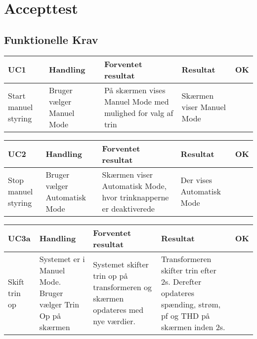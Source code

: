 \chapter{Accepttest}


\section{Funktionelle Krav}
\begin{table}[htbp]
	\centering
	\begin{tabular}{|p{2cm}|p{3cm}|p{4cm}|p{4.5cm}|p{1cm}|}
		\hline
		\textbf{UC1} & \textbf{Handling} & \textbf{Forventet resultat} & \textbf{Resultat} &\textbf{OK} \\\hline
		Start manuel styring & Bruger vælger Manuel Mode & På skærmen vises Manuel Mode med mulighed for valg af trin & Skærmen viser Manuel Mode & \checkmark \\\hline
		
		
	\end{tabular}
	
	
\end{table}

\begin{table}[htbp]
	\centering
	\begin{tabular}{|p{2cm}|p{3cm}|p{4cm}|p{4.5cm}|p{1cm}|}
		\hline
		\textbf{UC2} & \textbf{Handling} & \textbf{Forventet resultat} & \textbf{Resultat} &\textbf{OK} \\\hline
		Stop manuel styring & Bruger vælger Automatisk Mode & Skærmen viser Automatisk Mode, hvor trinknapperne er deaktiverede & Der vises Automatisk Mode & \checkmark \\\hline
		
		
	\end{tabular}
\end{table}

\begin{table}[htbp]
	\centering
	\begin{tabular}{|p{2cm}|p{3cm}|p{4cm}|p{4.5cm}|p{1cm}|}
		\hline
		\textbf{UC3a} & \textbf{Handling} & \textbf{Forventet resultat} & \textbf{Resultat} &\textbf{OK} \\\hline
		Skift trin op & Systemet er i Manuel Mode. Bruger vælger Trin Op på skærmen & Systemet skifter trin op på transformeren og skærmen opdateres med nye værdier. & Transformeren skifter trin efter 2s. Derefter opdateres spænding, strøm, pf og THD på skærmen inden 2s.  & \checkmark \\\hline
		
		
	\end{tabular}
\end{table}

